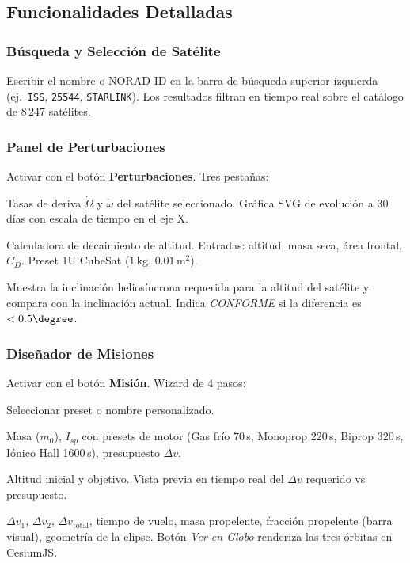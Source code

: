 \documentclass[12pt,a4paper]{article}
\newcommand{\dv}{\Delta v}
\newcommand{\dvtot}{\Delta v_{\text{total}}}
\begin{document}
\subsection{Funcionalidades Detalladas}

\subsubsection{B\'usqueda y Selecci\'on de Sat\'elite}

Escribir el nombre o NORAD ID en la barra de b\'usqueda superior izquierda (ej.\ \texttt{ISS}, \texttt{25544}, \texttt{STARLINK}). Los resultados filtran en tiempo real sobre el cat\'alogo de 8\,247 sat\'elites.

\subsubsection{Panel de Perturbaciones}

Activar con el bot\'on \textbf{Perturbaciones}. Tres pesta\~nas:

\begin{description}[leftmargin=2em]
  \item[J2:] Tasas de deriva $\dot\Omega$ y $\dot\omega$ del sat\'elite seleccionado. Gr\'afica SVG de evoluci\'on a 30 d\'ias con escala de tiempo en el eje X.
  \item[Drag:] Calculadora de decaimiento de altitud. Entradas: altitud, masa seca, \'area frontal, $C_D$. Preset 1U CubeSat ($1\,\text{kg}$, $0.01\,\text{m}^2$).
  \item[SSO:] Muestra la inclinaci\'on helios\'incrona requerida para la altitud del sat\'elite y compara con la inclinaci\'on actual. Indica \textit{CONFORME} si la diferencia es $<0.5\degree$.
\end{description}

\subsubsection{Dise\~nador de Misiones}

Activar con el bot\'on \textbf{Misi\'on}. Wizard de 4 pasos:

\begin{description}[leftmargin=2em]
  \item[Paso 1 --- Tipo:] Seleccionar preset o nombre personalizado.
  \item[Paso 2 --- Nave:] Masa ($m_0$), $I_{sp}$ con presets de motor (Gas fr\'io 70\,s, Monoprop 220\,s, Biprop 320\,s, I\'onico Hall 1600\,s), presupuesto $\dv$.
  \item[Paso 3 --- \'Orbitas:] Altitud inicial y objetivo. Vista previa en tiempo real del $\dv$ requerido vs presupuesto.
  \item[Paso 4 --- Resultados:] $\dv_1$, $\dv_2$, $\dvtot$, tiempo de vuelo, masa propelente, fracci\'on propelente (barra visual), geometr\'ia de la elipse. Bot\'on \textit{Ver en Globo} renderiza las tres \'orbitas en CesiumJS.
\end{description}
\end{document}
